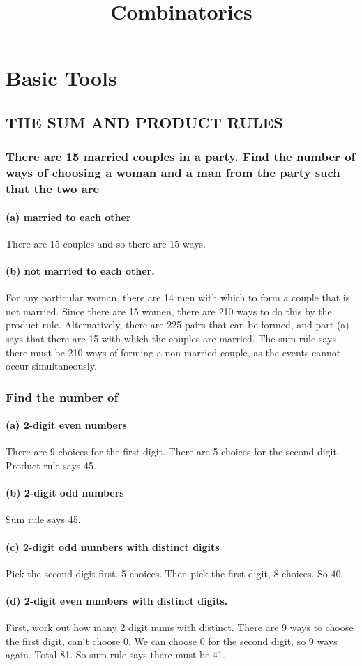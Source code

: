 \documentclass{article}
\title{Combinatorics}
\begin{document}
\section{Basic Tools}
\subsection{THE SUM AND PRODUCT RULES}
\subsubsection*{There are 15 married couples in a party. Find the number of ways of choosing a woman and a man
from the party such that the two are}
\paragraph*{(a) married to each other}
There are 15 couples and so there are 15 ways.
\paragraph*{(b) not married to each other.}
For any particular woman, there are 14 men with which to form a couple that is not married.
Since there are 15 women, there are 210 ways to do this by the product rule. Alternatively, there are 225 pairs that can be formed, and part (a) says that there are 15 with which the couples are married. The sum rule says there must be 210 ways of forming a non married couple, as the events cannot occur simultaneously.
\subsubsection*{Find the number of}
\paragraph*{(a) 2-digit even numbers}
There are 9 choices for the first digit. There are 5 choices for the second digit. Product rule says 45.
\paragraph*{(b) 2-digit odd numbers}
Sum rule says 45.
\paragraph*{(c) 2-digit odd numbers with
distinct digits}
Pick the second digit first. 5 choices. Then pick the first digit, 8 choices. So 40.
\paragraph*{(d) 2-digit even numbers with distinct digits.}
First, work out how many 2 digit nums with distinct. There are 9 ways to choose the first digit, can't choose 0. We can choose 0 for the second digit, so 9 ways again. Total 81. So sum rule says there must be 41.
\end{document}
